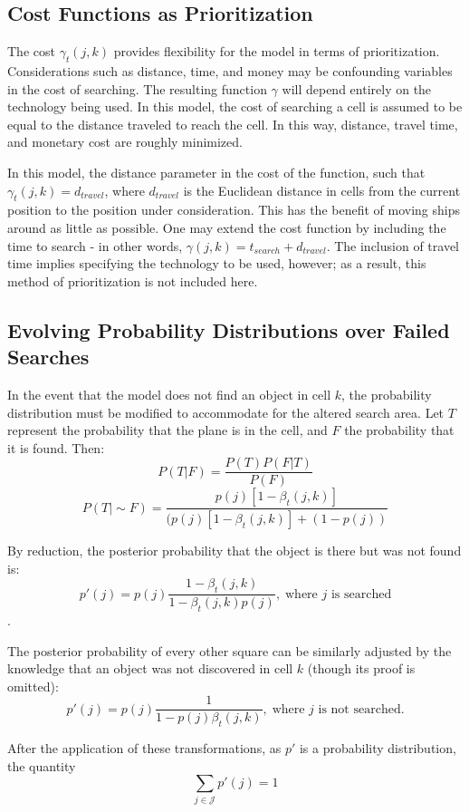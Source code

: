 \documentclass[a4paper]{article}
\begin{document}
\subsection{Cost Functions as Prioritization}

The cost $\gamma_t(j,k)$ provides flexibility for the model in terms of prioritization. Considerations such as distance, time, and money may be confounding variables in the cost of searching. The resulting function $\gamma$ will depend entirely on the technology being used. In this model, the cost of searching a cell is assumed to be equal to the distance traveled to reach the cell. In this way, distance, travel time, and monetary cost are roughly minimized.

In this model, the distance parameter in the cost of the function, such that $\gamma_t(j,k)=d_{travel}$, where $d_{travel}$ is the Euclidean distance in cells from the current position to the position under consideration. This has the benefit of moving ships around as little as possible. One may extend the cost function by including the time to search - in other words, $\gamma(j,k)=t_{search}+d_{travel}$. The inclusion of travel time implies specifying the technology to be used, however; as a result, this method of prioritization is not included here.  

\subsection{Evolving Probability Distributions over Failed Searches}

In the event that the model does not find an object in cell $k$, the probability distribution must be modified to accommodate for the altered search area. Let $T$ represent the probability that the plane is in the cell, and $F$ the probability that it is found. Then: 
$$P(T|F)=\frac{P(T)P(F|T)}{P(F)}$$ 
$$P(T|\sim F)=\frac{p(j)[1-\beta_t(j,k)]}{(p(j)[1-\beta_t(j,k)]+(1-p(j))}$$

By reduction, the posterior probability that the object is there but was not found is: $$p'(j)=p(j)\frac{1-\beta_t(j,k)}{1-\beta_t(j,k)p(j)},\;\mbox{where }j\mbox{ is searched}$$.

The posterior probability of every other square can be similarly adjusted by the knowledge that an object was not discovered in cell $k$ (though its proof is omitted): $$p'(j)=p(j)\frac{1}{1-p(j)\beta_t(j,k)},\;\mbox{where }j\mbox{ is not searched.}$$

After the application of these transformations, as $p'$ is a probability distribution, the quantity $$\sum_{j\in\mathcal{J}}p'(j) = 1$$
\end{document}
